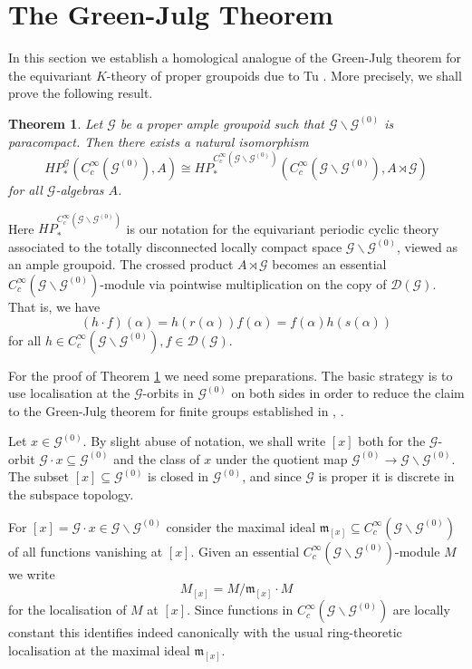 \documentclass{amsart}
\newtheorem{thm}{Theorem}[section]
\newcommand{\G}{\mathcal{G}}
\newcommand{\DG}{\mathcal{D}(\mathcal{G})}
\newcommand{\ccinfty}{C_c^\infty}
\begin{document}
\section{The Green-Julg Theorem} \label{section:greenjulg}

In this section we establish a homological analogue of the Green-Julg theorem for the equivariant $ K $-theory of proper groupoids due to Tu \cite[Proposition 6.25]{TU_novikovhyperbolique}. More precisely, we shall prove the following result. 

\begin{thm} \label{Green-Julg} 
Let $ \G $ be a proper ample groupoid such that $ \G \backslash\G^{(0)} $ is paracompact. Then there exists a natural isomorphism 
$$
HP_*^\G(\ccinfty(\G^{(0)}),A)\cong HP_*^{\ccinfty(\G\backslash\G^{(0)})}(\ccinfty(\G\backslash \G^{(0)}), A \rtimes \G)
$$
for all $ \G $-algebras $ A $. 
\end{thm}

Here $ HP^{\ccinfty(\G \backslash \G^{(0)})}_* $ is our notation for the equivariant periodic cyclic theory associated to the totally disconnected locally compact 
space $ \G \backslash \G^{(0)} $, viewed as an ample groupoid. The crossed product $ A \rtimes \G $ becomes an essential $ \ccinfty(\G\backslash\G^{(0)}) $-module via 
pointwise multiplication on the copy of $ \DG $. That is, we have 
$$
(h \cdot f)(\alpha) = h(r(\alpha)) f(\alpha) = f(\alpha) h(s(\alpha)) 
$$
for all $ h \in \ccinfty(\G\backslash\G^{(0)}), f \in \DG $. 

For the proof of Theorem \ref{Green-Julg} we need some preparations. The basic strategy is to use localisation at the $ \G $-orbits in $ \G^{(0)} $ on both sides in order to reduce the claim to the Green-Julg theorem for finite groups established in \cite{VOIGT_thesis}, \cite{VOIGT_equivariantperiodiccyclichomology}. 

Let $ x \in \G^{(0)} $. By slight abuse of notation, we shall write $ [x] $ both for the $ \G $-orbit $ \G \cdot x \subseteq \G^{(0)} $ and the class of $ x $ under the quotient 
map $ \G^{(0)} \rightarrow \G \backslash \G^{(0)} $. The subset $ [x] \subseteq \G^{(0)} $ is closed in $ \G^{(0)} $, 
and since $ \G $ is proper it is discrete in the subspace topology. 

For $ [x] = \G \cdot x \in \G \backslash \G^{(0)} $ consider the maximal ideal $ \mathfrak{m}_{[x]} \subseteq \ccinfty(\G \backslash \G^{(0)}) $ of all functions vanishing at $ [x] $. Given an essential $ \ccinfty(\G \backslash \G^{(0)}) $-module $ M $ we write 
$$
M_{[x]} = M/\mathfrak{m}_{[x]} \cdot M 
$$
for the localisation of $ M $ at $ [x] $. Since functions in $ \ccinfty(\G \backslash \G^{(0)}) $ are locally constant this identifies indeed canonically with the usual ring-theoretic localisation at the maximal ideal $ \mathfrak{m}_{[x]} $. 
\end{document}

